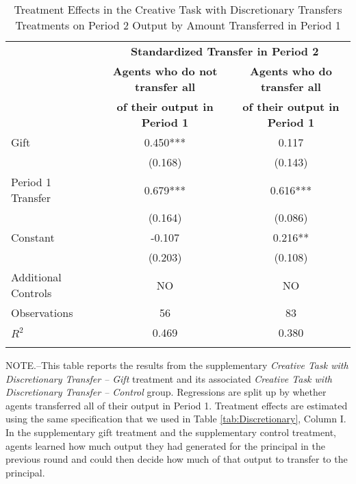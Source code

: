 \begin{table}[h]%
\captionsetup{justification=centering}
\setlength\tabcolsep{2pt}
\caption{Treatment Effects in the Creative Task with Discretionary Transfers Treatments on Period 2 Output by Amount Transferred in Period 1}
\label{tab:TransferSplit}
\begin{center}%
{\small\renewcommand{\arraystretch}{1}%
\begin{tabular}{lcc}
\hline\noalign{\smallskip}
 & \multicolumn{2}{c}{\bf Standardized Transfer in Period 2} \\
\cline{2-3} 
 & \bf \hspace{5pt} Agents who do not transfer all \hspace{5pt} & \hspace{5pt} \bf Agents who do transfer all \hspace{5pt} \\
 & \bf of their output in Period 1 & \bf of their output in Period 1 \\
\hline\noalign{\smallskip}
Gift                &       0.450***&       0.117   \\
                    &     (0.168)   &     (0.143)   \\
Period 1 Transfer   &       0.679***&       0.616***\\
                    &     (0.164)   &     (0.086)   \\
Constant            &      -0.107   &       0.216** \\
                    &     (0.203)   &     (0.108)   \\
\hline
\noalign{\smallskip}
Additional Controls & NO & NO  \\
\hline
\noalign{\smallskip}
Observations        &          56   &          83   \\
$R^2$               &       0.469   &       0.380   \\
\hline\noalign{\medskip}
\end{tabular}}
\begin{minipage}{\textwidth} \setlength{\parindent}{15pt}
\footnotesize NOTE.--This table reports the results from the supplementary \textit{Creative Task with Discretionary Transfer -- Gift} treatment and its associated \textit{Creative Task with Discretionary Transfer -- Control} group. 
Regressions are split up by whether agents transferred all of their output in Period 1. 
Treatment effects are estimated using the same specification that we used in Table \ref{tab:Discretionary}, Column I. 
In the supplementary gift treatment and the supplementary control treatment, agents learned how much output they had generated for the principal in the previous round and could then decide how much of that output to transfer to the principal. 

\end{minipage}
\end{center}
\end{table}
